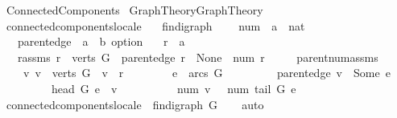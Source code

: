 %
\begin{isabellebody}%
\def\isabellecontext{Connected{\isacharunderscore}Components}%
%
\isadelimtheory
%
\endisadelimtheory
%
\isatagtheory
{}\isamarkupfalse%
\ Connected{\isacharunderscore}Components\isanewline
{}\ {\isachardoublequoteopen}{\isachardot}{\isachardot}{\isacharslash}Graph{\isacharunderscore}Theory{\isacharslash}Graph{\isacharunderscore}Theory{\isachardoublequoteclose}\isanewline
{}%
\endisatagtheory
{\isafoldtheory}%
%
\isadelimtheory
\isanewline
%
\endisadelimtheory
\isanewline
{}\isamarkupfalse%
\ connected{\isacharunderscore}components{\isacharunderscore}locale\ {\isacharequal}\isanewline
\ \ fin{\isacharunderscore}digraph\ {\isacharplus}\isanewline
\ \ \ num\ {\isacharcolon}{\isacharcolon}\ {\isachardoublequoteopen}{\isacharprime}a\ {\isasymRightarrow}\ nat{\isachardoublequoteclose}\isanewline
\ \ \ parent{\isacharunderscore}edge\ {\isacharcolon}{\isacharcolon}\ {\isachardoublequoteopen}{\isacharprime}a\ {\isasymRightarrow}\ {\isacharprime}b\ option{\isachardoublequoteclose}\isanewline
\ \ \ r\ {\isacharcolon}{\isacharcolon}\ {\isacharprime}a\isanewline
\ \ \ r{\isacharunderscore}assms{\isacharcolon}\ {\isachardoublequoteopen}r\ {\isasymin}\ verts\ G\ {\isasymand}\ parent{\isacharunderscore}edge\ r\ {\isacharequal}\ None\ {\isasymand}\ num\ r\ {\isacharequal}\ {}{\isachardoublequoteclose}\isanewline
\ \ \ parent{\isacharunderscore}num{\isacharunderscore}assms{\isacharcolon}\ \isanewline
\ \ \ \ {\isachardoublequoteopen}{\isasymAnd}v{\isachardot}\ v\ {\isasymin}\ verts\ G\ {\isasymand}\ v\ {\isasymnoteq}\ r\ {\isasymLongrightarrow}\isanewline
\ \ \ \ \ \ \ {\isasymexists}e\ {\isasymin}\ arcs\ G{\isachardot}\isanewline
\ \ \ \ \ \ \ \ \ parent{\isacharunderscore}edge\ v\ {\isacharequal}\ Some\ e\ {\isasymand}\isanewline
\ \ \ \ \ \ \ \ \ head\ G\ e\ {\isacharequal}\ v\ {\isasymand}\isanewline
\ \ \ \ \ \ \ \ \ num\ v\ {\isacharequal}\ \ num\ {\isacharparenleft}tail\ G\ e{\isacharparenright}\ {\isacharplus}\ {}{\isachardoublequoteclose}\isanewline
\isanewline
{}\isamarkupfalse%
\ connected{\isacharunderscore}components{\isacharunderscore}locale\ {\isasymsubseteq}\ fin{\isacharunderscore}digraph\ G\isanewline
%
\isadelimproof
\ \ %
\endisadelimproof
%
\isatagproof
{}\isamarkupfalse%
\ auto%
\endisatagproof
{\isafoldproof}%
%
\isadelimproof
\isanewline
%
\endisadelimproof
\isanewline

\end{isabellebody}
